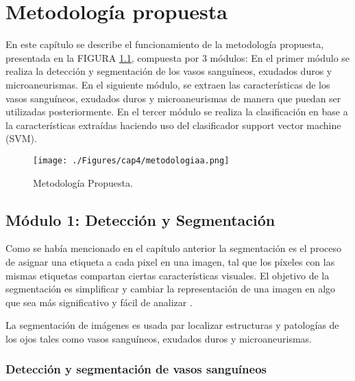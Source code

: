 \newpage{\ } 
\thispagestyle{empty} 

\chapter{Metodología propuesta}
En este capítulo  se describe  el funcionamiento de la metodología propuesta, presentada en la FIGURA \ref{fig:metodo}, compuesta por 3 módulos:
En el primer módulo se realiza la detección y segmentación de los vasos sanguíneos,  exudados duros y microaneurismas. En el siguiente módulo, se extraen las características de los vasos sanguíneos, exudados duros y microaneurismas de manera que puedan ser utilizadas posteriormente. En el tercer módulo se realiza la clasificación en base a la características extraídas haciendo uso del clasificador support vector machine (SVM). 
\begin{figure}[H]
	\centering
		\texttt{[image: ./Figures/cap4/metodologiaa.png]}
	\caption{Metodología Propuesta.}
	\label{fig:metodo}
\end{figure}


\section{Módulo 1: Detección y Segmentación}
Como se había mencionado en el capítulo anterior la segmentación es el proceso de asignar una etiqueta  a cada pixel en una imagen, tal que los píxeles con las mismas etiquetas compartan ciertas características visuales. El objetivo de la segmentación es simplificar y cambiar la representación de una imagen en algo que sea más significativo y fácil de analizar \cite{seg1,seg2}.
  
La segmentación de imágenes es usada par localizar estructuras y patologías de los ojos tales como vasos sanguíneos, exudados duros y microaneurismas.

\subsection{Detección y segmentación de vasos sanguíneos}



